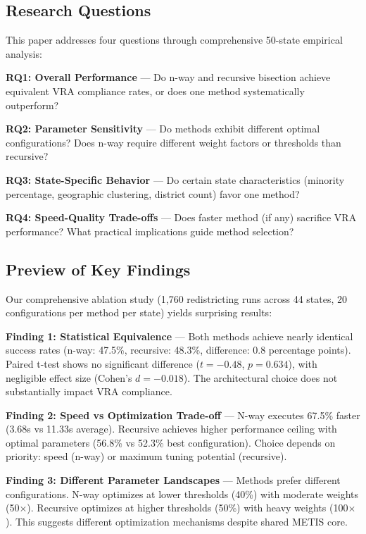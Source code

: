 \subsection{Research Questions}

This paper addresses four questions through comprehensive 50-state empirical analysis:

\textbf{RQ1: Overall Performance} — Do n-way and recursive bisection achieve equivalent VRA compliance rates, or does one method systematically outperform?

\textbf{RQ2: Parameter Sensitivity} — Do methods exhibit different optimal configurations? Does n-way require different weight factors or thresholds than recursive?

\textbf{RQ3: State-Specific Behavior} — Do certain state characteristics (minority percentage, geographic clustering, district count) favor one method?

\textbf{RQ4: Speed-Quality Trade-offs} — Does faster method (if any) sacrifice VRA performance? What practical implications guide method selection?

\subsection{Preview of Key Findings}

Our comprehensive ablation study (1,760 redistricting runs across 44 states, 20 configurations per method per state) yields surprising results:

\textbf{Finding 1: Statistical Equivalence} — Both methods achieve nearly identical success rates (n-way: 47.5\%, recursive: 48.3\%, difference: 0.8 percentage points). Paired t-test shows no significant difference ($t=-0.48$, $p=0.634$), with negligible effect size (Cohen's $d=-0.018$). The architectural choice does not substantially impact VRA compliance.

\textbf{Finding 2: Speed vs Optimization Trade-off} — N-way executes 67.5\% faster (3.68s vs 11.33s average). Recursive achieves higher performance ceiling with optimal parameters (56.8\% vs 52.3\% best configuration). Choice depends on priority: speed (n-way) or maximum tuning potential (recursive).

\textbf{Finding 3: Different Parameter Landscapes} — Methods prefer different configurations. N-way optimizes at lower thresholds (40\%) with moderate weights (50$\times$). Recursive optimizes at higher thresholds (50\%) with heavy weights (100$\times$). This suggests different optimization mechanisms despite shared METIS core.

